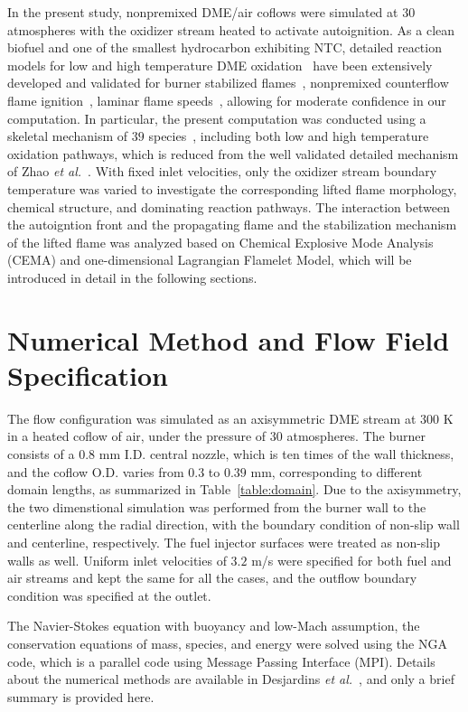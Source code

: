 \documentclass[review,3p,times]{elsarticleUS}
\begin{document}
In the present study, nonpremixed DME/air coflows were simulated at $30$ atmospheres with the oxidizer stream heated to activate autoignition.  As a clean biofuel and one of the smallest hydrocarbon exhibiting NTC, detailed reaction models for low and high temperature DME oxidation~\cite{curran98,fischer00,curran00,zhao08} have been extensively developed and validated for burner stabilized flames~\cite{kaiser00}, nonpremixed counterflow flame ignition~\cite{zheng05}, laminar flame speeds~\cite{qin05}, allowing for moderate confidence in our computation.  In particular, the present computation was conducted using a skeletal mechanism of $39$ species~\cite{bansal11}, including both low and high temperature oxidation pathways, which is reduced from the well validated detailed mechanism of Zhao \emph{et al.}~\cite{zhao08}.  With fixed inlet velocities, only the oxidizer stream boundary temperature was varied to investigate the corresponding lifted flame morphology, chemical structure, and dominating reaction pathways.  The interaction between the autoigntion front and the propagating flame and the stabilization mechanism of the lifted flame was analyzed based on Chemical Explosive Mode Analysis (CEMA) and one-dimensional Lagrangian Flamelet Model, which will be introduced in detail in the following sections.
 

\section{Numerical Method and Flow Field Specification}

The flow configuration was simulated as an axisymmetric DME stream at $300$ K in a heated coflow of air, under the pressure of $30$ atmospheres.  The burner consists of a $0.8$ mm I.D. central nozzle, which is ten times of the wall thickness, and the coflow O.D. varies from $0.3$ to $0.39$ mm, corresponding to different domain lengths, as summarized in Table~\ref{table:domain}.  Due to the axisymmetry, the two dimenstional simulation was performed from the burner wall to the centerline along the radial direction, with the boundary condition of non-slip wall and centerline, respectively.  The fuel injector surfaces were treated as non-slip walls as well.  Uniform inlet velocities of $3.2$ m/s were specified for both fuel and air streams and kept the same for all the cases, and the outflow boundary condition was specified at the outlet.  

The Navier-Stokes equation with buoyancy and low-Mach assumption, the conservation equations of mass, species, and energy were solved using the NGA code, which is a parallel code using Message Passing Interface (MPI).  Details about the numerical methods are available in Desjardins \emph{et al.}~\cite{desjardins08}, and only a brief summary is provided here.
\end{document}
